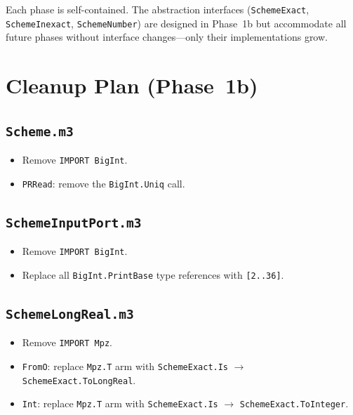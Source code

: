 \documentclass[12pt]{article}
\begin{document}
\noindent Each phase is self-contained.  The abstraction interfaces
({\tt SchemeExact}, {\tt SchemeInexact}, {\tt SchemeNumber}) are
designed in Phase~1b but accommodate all future phases without
interface changes---only their implementations grow.

\section{Cleanup Plan (Phase~1b)}
\label{sec:cleanup}

\subsection{{\tt Scheme.m3}}

\begin{itemize}[nosep]
\item Remove {\tt IMPORT BigInt}.
\item {\tt PRRead}: remove the {\tt BigInt.Uniq} call.
\end{itemize}

\subsection{{\tt SchemeInputPort.m3}}

\begin{itemize}[nosep]
\item Remove {\tt IMPORT BigInt}.
\item Replace all {\tt BigInt.PrintBase} type references with
  {\tt [2..36]}.
\end{itemize}

\subsection{{\tt SchemeLongReal.m3}}

\begin{itemize}[nosep]
\item Remove {\tt IMPORT Mpz}.
\item {\tt FromO}: replace {\tt Mpz.T} arm with
  {\tt SchemeExact.Is} $\to$ {\tt SchemeExact.ToLongReal}.
\item {\tt Int}: replace {\tt Mpz.T} arm with
  {\tt SchemeExact.Is} $\to$ {\tt SchemeExact.ToInteger}.
\end{itemize}
\end{document}
